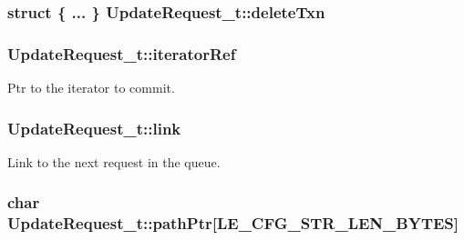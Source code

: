 \subsubsection[{\texorpdfstring{delete\+Txn}{deleteTxn}}]{\setlength{\rightskip}{0pt plus 5cm}struct \{ ... \} 
         Update\+Request\+\_\+t\+::delete\+Txn}\hypertarget{struct_update_request__t_ac49ff4cdeb64dd0ed694ded17b6f12fb}{}\label{struct_update_request__t_ac49ff4cdeb64dd0ed694ded17b6f12fb}
\subsubsection[{\texorpdfstring{iterator\+Ref}{iteratorRef}}]{ Update\+Request\+\_\+t\+::iterator\+Ref}\hypertarget{struct_update_request__t_af3cccbf7d85cccd6a16aedb3d96d4c14}{}\label{struct_update_request__t_af3cccbf7d85cccd6a16aedb3d96d4c14}


Ptr to the iterator to commit. 

\subsubsection[{\texorpdfstring{link}{link}}]{ Update\+Request\+\_\+t\+::link}\hypertarget{struct_update_request__t_a8514eb07a422bebf8ba8db2d81d45716}{}\label{struct_update_request__t_a8514eb07a422bebf8ba8db2d81d45716}


Link to the next request in the queue. 

\subsubsection[{\texorpdfstring{path\+Ptr}{pathPtr}}]{\setlength{\rightskip}{0pt plus 5cm}char Update\+Request\+\_\+t\+::path\+Ptr\mbox{[}{\bf L\+E\+\_\+\+C\+F\+G\+\_\+\+S\+T\+R\+\_\+\+L\+E\+N\+\_\+\+B\+Y\+T\+ES}\mbox{]}}\hypertarget{struct_update_request__t_ac9600d408f928f392b6acb3f03d88b56}{}\label{struct_update_request__t_ac9600d408f928f392b6acb3f03d88b56}



